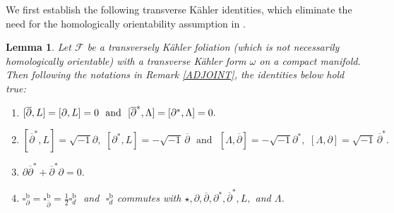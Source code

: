 \documentclass[12pt]{amsart}
\numberwithin{equation}{section}
\newtheorem{lemma}  [theorem]     {Lemma}
\theoremstyle{definition}
\theoremstyle{definition}
\theoremstyle{definition}
\renewcommand{\1}{\mathsf{1}}
\renewcommand{\>}{\rightarrow}
\newcommand{\p}{\partial}
\newcommand{\bp}{\overline\partial}
\def\p{\partial}
\def\mc{\mathcal}
\theoremstyle{plain} %
\theoremstyle{plain} %
\theoremstyle{plain} %
\begin{document}
	We first establish the following transverse K\"ahler identities, which eliminate the need for the homologically orientability assumption in \cite[Lemma 3.4.4, Proposition 3.4.5]{EKA90}.
	\begin{lemma}\label{TranKahiden}
		Let  $\mc F$ be a transversely K\"ahler foliation (which is not necessarily homologically orientable) with a transverse K\"ahler form $\omega$ on a compact manifold. Then following the notations in Remark \ref{ADJOINT}, the  identities below hold true:
		\begin{enumerate}
			\item \label{1}$[\bp,L]=[\partial, L]=0\text{\,\, and \,\,}[\bp^*,\Lambda]=[\p^*,\Lambda]=0.$
			\item \label{2}$[\bp^*,L]=\sqrt{-1}\p,\,\, [\p^*,L]=-\sqrt{-1}\,\bp\,\,\text{ and }\,\,
			[\Lambda,\bp]=-\sqrt{-1}\p^*,\,\,[\Lambda,\partial]=\sqrt{-1}\,\bp^*.$
			\item \label{3}$\partial\bp^*+\bp^*\p=0.$
			\item \label{4} $\square^\mathrm{b}_\p=\square^\mathrm{b}_{\bp}=\frac{1}{2}\square^{\mathrm b}_d \,\,$ and $\,\,\square_d^\mathrm{b}$ commutes with $\star,\p,\bp,\p^*,{\bp}^*, L,$ and $\Lambda$.
		\end{enumerate}
	\end{lemma}
\end{document}
